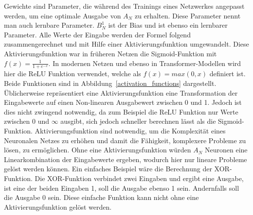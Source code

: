 Gewichte sind Parameter, die während des Trainings eines Netzwerkes angepasst werden, um eine optimale Ausgabe von $A_N$ zu erhalten.
Diese Parameter nennt man auch lernbare Parameter.
$B^1_N$ ist der Bias und ist ebenso ein lernbarer Parameter.
Alle Werte der Eingabe werden der Formel folgend zusammengerechnet und mit Hilfe einer Aktivierungsfunktion umgewandelt.
Diese Aktivierungsfunktion war in früheren Netzen die Sigmoid-Funktion mit $f(x)=\frac{1}{1+e^{-x}}$.
In modernen Netzen und ebenso in Transformer-Modellen wird hier die ReLU Funktion verwendet, welche als $f(x)=max(0,x)$ definiert ist.
Beide Funktionen sind in Abbildung~\ref{activation_functions} dargestellt.
Üblicherweise repräsentiert eine Aktivierungsfunktion eine Transformation der Eingabewerte auf einen Non-linearen Ausgabewert zwischen 0 und 1.
Jedoch ist dies nicht zwingend notwendig, da zum Beispiel die ReLU Funktion nur Werte zwischen 0 und $\infty$ ausgibt, sich jedoch schneller berechnen lässt als die Sigmoid-Funktion.
Aktivierungsfunktion sind notwendig, um die Komplexität eines Neuronalen Netzes zu erhöhen und damit die Fähigkeit, komplexere Probleme zu lösen, zu ermöglichen.
Ohne eine Aktivierungsfunktion würden $A_N$ Neuronen eine Linearkombination der Eingabewerte ergeben, wodurch hier nur lineare Probleme gelöst werden können.
Ein einfaches Beispiel wäre die Berechnung der XOR-Funktion. Die XOR-Funktion verbindet zwei Eingaben und ergibt eine Ausgabe, ist eine der beiden Eingaben 1, soll die Ausgabe ebenso 1 sein.
Andernfalls soll die Ausgabe 0 sein. Diese einfache Funktion kann nicht ohne eine Aktivierungsfunktion gelöst werden.\\

